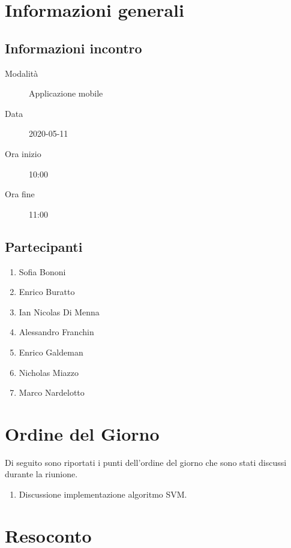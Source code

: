 \documentclass{article}
\begin{document}


\section{Informazioni generali}%
\label{sec:informazioni_generali}

\subsection{Informazioni incontro}%
\label{sub:informazioni_incontro}

\begin{description}
  \item[Modalità] Applicazione mobile 
  \item[Data] 2020-05-11
  \item[Ora inizio] 10:00
  \item[Ora fine] 11:00
\end{description}

\subsection{Partecipanti}%
\label{sub:partecipanti}

\begin{enumerate}
  \item Sofia Bononi
  \item Enrico Buratto
  \item Ian Nicolas Di Menna
  \item Alessandro Franchin
  \item Enrico Galdeman
  \item Nicholas Miazzo
  \item Marco Nardelotto
\end{enumerate}

\section{Ordine del Giorno}%
\label{ordine_del_giorno}
Di seguito sono riportati i punti dell'ordine del giorno che sono stati discussi durante la riunione.
\begin{enumerate}
  \item Discussione implementazione algoritmo SVM.
\end{enumerate}

\section{Resoconto}%
\label{resoconto}
\end{document}
